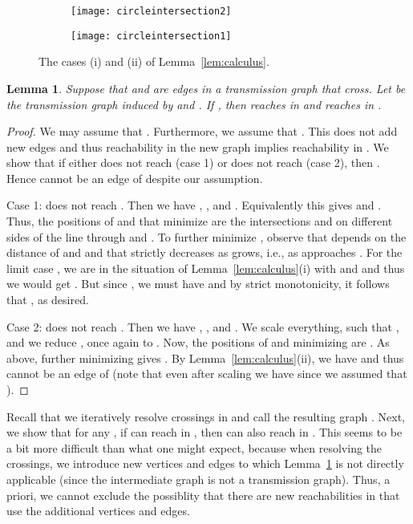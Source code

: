 \documentclass[11pt,a4paper]{paper}
\newtheorem{lemma}[theorem]{Lemma}
\begin{document}
\begin{figure}[hbt]
\centering
\begin{subfigure}[b]{0.5\textwidth}
\centering
  \texttt{[image: circleintersection2]}
  \caption{}
\label{fig:calculusa1}
\end{subfigure}
\begin{subfigure}[b]{0.45\textwidth}
  \texttt{[image: circleintersection1]}
\caption{}
\label{fig:calculusa}
\end{subfigure}
\caption{The cases (i) and (ii) of Lemma~\ref{lem:calculus}.}
\end{figure}


\begin{lemma}
\label{lem:resolving}
Suppose that  and  are
edges in a transmission graph  that cross.
Let  be the transmission graph induced by
 and .  If , then  reaches  in
 and  reaches  in .
\end{lemma}

\begin{proof}
We may assume that . Furthermore, we assume that 
. This does
not add new edges and thus reachability in the new graph
implies reachability in .
We show that if either  does not reach  (case 1)
or  does not reach  (case 2), then . Hence
 cannot be an edge of  despite our assumption.

Case 1:  does not reach .
Then we have , , 
and .
Equivalently this gives 
and .
Thus, the positions of  and  that minimize 
are the intersections 
and  on different sides of
the line through  and .
To further  minimize , observe that  depends on the distance
of  and  and that  strictly decreases as  grows, i.e.,
as  approaches .
For the limit case , we are in the situation
of Lemma~\ref{lem:calculus}(i) with  and 
and thus we would get .
But since , we must have  and by
strict monotonicity, it follows that ,
as desired.

Case 2:  does not reach . Then we have
, ,  and .
We scale everything, such that , and we reduce
,  once again to .
Now, the positions of  and  minimizing  are
. As above,
further minimizing  gives .
By Lemma~\ref{lem:calculus}(ii), we have  and
thus  cannot be an edge of  (note that even after scaling we have
 since we assumed that ).
\end{proof}

Recall that we iteratively resolve crossings in  and call the resulting graph
. Next, we show that for any , if  can
reach  in , then  can also reach  in .
This seems to be a bit more difficult than what one might expect, because
when resolving the crossings, we introduce new vertices and edges
to which Lemma~\ref{lem:resolving} is not directly applicable 
(since the intermediate graph is not a transmission graph). Thus, 
a priori, we cannot exclude the possiblity that there are new 
reachabilities in  that use the additional 
vertices and edges.
\end{document}
